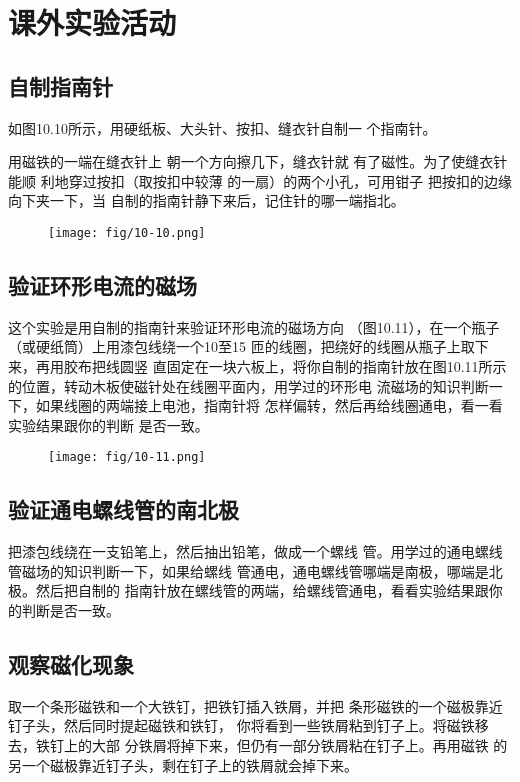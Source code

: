 
\chapter{课外实验活动}
\section{自制指南针}
如图10.10所示，用硬纸板、大头针、按扣、缝衣针自制一
个指南针。

用磁铁的一端在缝衣针上
朝一个方向擦几下，缝衣针就
有了磁性。为了使缝衣针能顺
利地穿过按扣（取按扣中较薄
的一扇）的两个小孔，可用钳子
把按扣的边缘向下夹一下，当
自制的指南针静下来后，记住针的哪一端指北。

\begin{figure}[htp]\centering
    \texttt{[image: fig/10-10.png]}
    \caption{}
    \end{figure}


\section{验证环形电流的磁场}
这个实验是用自制的指南针来验证环形电流的磁场方向
（图10.11），在一个瓶子（或硬纸筒）上用漆包线绕一个10至15
匝的线圈，把绕好的线圈从瓶子上取下来，再用胶布把线圆竖
直固定在一块六板上，将你自制的指南针放在图10.11所示
的位置，转动木板使磁针处在线圈平面内，用学过的环形电
流磁场的知识判断一下，如果线圈的两端接上电池，指南针将
怎样偏转，然后再给线圈通电，看一看实验结果跟你的判断
是否一致。
\begin{figure}[htp]\centering
    \texttt{[image: fig/10-11.png]}
    \caption{}
    \end{figure}

    \section{验证通电螺线管的南北极}
把漆包线绕在一支铅笔上，然后抽出铅笔，做成一个螺线
管。用学过的通电螺线管磁场的知识判断一下，如果给螺线
管通电，通电螺线管哪端是南极，哪端是北极。然后把自制的
指南针放在螺线管的两端，给螺线管通电，看看实验结果跟你
的判断是否一致。

\section{观察磁化现象}
取一个条形磁铁和一个大铁钉，把铁钉插入铁屑，并把
条形磁铁的一个磁极靠近钉子头，然后同时提起磁铁和铁钉，
你将看到一些铁屑粘到钉子上。将磁铁移去，铁钉上的大部
分铁屑将掉下来，但仍有一部分铁屑粘在钉子上。再用磁铁
的另一个磁极靠近钉子头，剩在钉子上的铁屑就会掉下来。

